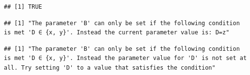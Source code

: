 \documentclass[
]{scrbook}
\newenvironment{Shaded}{\begin{snugshade}}{\end{snugshade}}
\newcommand{\AttributeTok}[1]{\textcolor[rgb]{0.77,0.63,0.00}{#1}}
\newcommand{\CommentTok}[1]{\textcolor[rgb]{0.56,0.35,0.01}{\textit{#1}}}
\newcommand{\ConstantTok}[1]{\textcolor[rgb]{0.00,0.00,0.00}{#1}}
\newcommand{\DecValTok}[1]{\textcolor[rgb]{0.00,0.00,0.81}{#1}}
\newcommand{\FunctionTok}[1]{\textcolor[rgb]{0.00,0.00,0.00}{#1}}
\newcommand{\NormalTok}[1]{#1}
\newcommand{\SpecialCharTok}[1]{\textcolor[rgb]{0.00,0.00,0.00}{#1}}
\newcommand{\StringTok}[1]{\textcolor[rgb]{0.31,0.60,0.02}{#1}}
\renewenvironment{Shaded} {\begin{snugshade}\small} {\end{snugshade}}
\begin{document}
\begin{Shaded}
\end{Shaded}

\begin{verbatim}
## [1] TRUE
\end{verbatim}

\begin{Shaded}
\end{Shaded}

\begin{verbatim}
## [1] "The parameter 'B' can only be set if the following condition is met 'D ∈ {x, y}'. Instead the current parameter value is: D=z"
\end{verbatim}

\begin{Shaded}
\end{Shaded}

\begin{verbatim}
## [1] "The parameter 'B' can only be set if the following condition is met 'D ∈ {x, y}'. Instead the parameter value for 'D' is not set at all. Try setting 'D' to a value that satisfies the condition"
\end{verbatim}

\begin{Shaded}
\end{Shaded}
\end{document}
